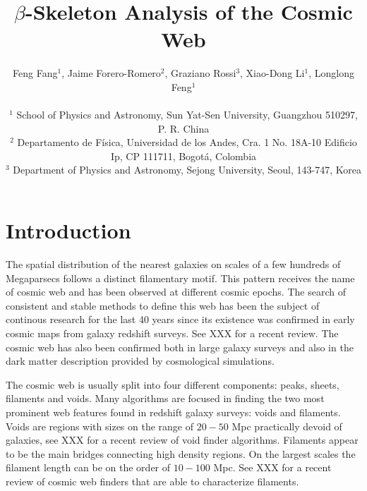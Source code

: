 \documentclass[useAMS,usenatbib]{mnras}
\begin{document}
\title[$\beta$-Skeleton Analysis]{$\beta$-Skeleton Analysis of the Cosmic Web}

\author[Fang, Forero-Romero, Rossi, Li \& Feng (2018)]
{Feng Fang$^1$, Jaime Forero-Romero$^2$, Graziano Rossi$^3$, Xiao-Dong Li$^1$, Longlong Feng$^1$ \\ \\
$^1$ School of Physics and Astronomy, Sun Yat-Sen University, Guangzhou 510297, P. R. China \\
$^2$ Departamento de F{\'i}sica, Universidad de los Andes, Cra. 1 No. 18A-10 Edificio Ip, CP 111711, Bogot{\'a}, Colombia \\
$^3$ Department of Physics and Astronomy, Sejong University, Seoul, 143-747, Korea}

\pagerange{\pageref{firstpage}--\pageref{lastpage}} 
\maketitle
\label{firstpage}


 

\section{Introduction}

The spatial distribution of the nearest galaxies on scales of a few
hundreds of Megaparsecs follows a distinct filamentary motif.
This pattern receives the name of cosmic web and has been observed at
different cosmic epochs.  
The search of consistent and stable methods to define this web has
been the subject of continous research for the last 40 years since its
existence was confirmed in early cosmic maps from galaxy redshift
surveys.
See XXX for a recent review.
The cosmic web has also been confirmed both in large galaxy surveys
and also in the dark matter description provided by cosmological
simulations.  

The cosmic web is usually split into four different components: peaks,
sheets, filaments and voids.
Many algorithms are focused in finding the two most prominent web features
found in redshift galaxy surveys: voids and filaments. 
Voids are regions with sizes on the range of $20-50$ Mpc
practically devoid of galaxies, see XXX for a recent review of
void finder algorithms.
Filaments appear to be the main bridges connecting high
density regions. 
On the largest scales the filament length can be on the order of
$10-100$ Mpc.
See XXX for a recent review of cosmic web finders that are able to
characterize filaments. 
\end{document}
